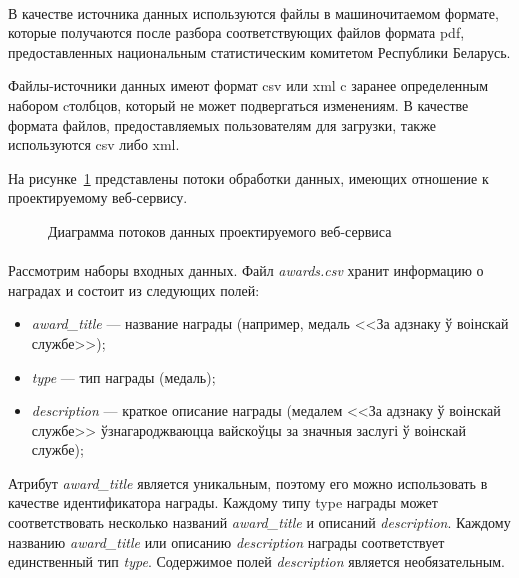 \paragraph{}
В качестве источника данных используются файлы в машиночитаемом формате,
которые получаются после разбора соответствующих файлов формата pdf,
предоставленных национальным статистическим комитетом Республики Беларусь.

Файлы-источники данных имеют формат csv или xml c заранее определенным
набором cтолбцов, который не может подвергаться изменениям.
В качестве формата файлов, предоставляемых пользователям для загрузки,
также используются csv либо xml.

На рисунке~\ref{fig:activity_diagram} представлены потоки обработки данных,
имеющих отношение к проектируемому веб-сервису.

\begin{figure}[h!]
  \centering
  \small{
    
  }
  \caption{Диаграмма потоков данных проектируемого веб-сервиса}
  \label{fig:activity_diagram}
\end{figure}

\pagebreak
\paragraph{}
Рассмотрим наборы входных данных.
Файл \textit{awards.csv} хранит информацию о наградах и состоит из следующих полей:
\begin{itemize}
\item
  \textit{award\_title} --- название награды
  (например, медаль <<За адзнаку ў воінскай службе>>);
\item
  \textit{type} --- тип награды
  (медаль);
\item
  \textit{description} --- краткое описание награды
  (медалем <<За адзнаку ў воінскай службе>>
  ўзнагароджваюцца вайскоўцы за значныя заслугі ў воінскай службе);
\end{itemize}

Атрибут \textit{award\_title} является уникальным, поэтому его можно использовать
в качестве идентификатора награды.
Каждому типу type награды может соответствовать несколько названий 
\textit{award\_title} и описаний \textit{description}.
Каждому названию \textit{award\_title} или описанию \textit{description} награды
соответствует единственный тип \textit{type}.
Содержимое полей \textit{description} является необязательным.

